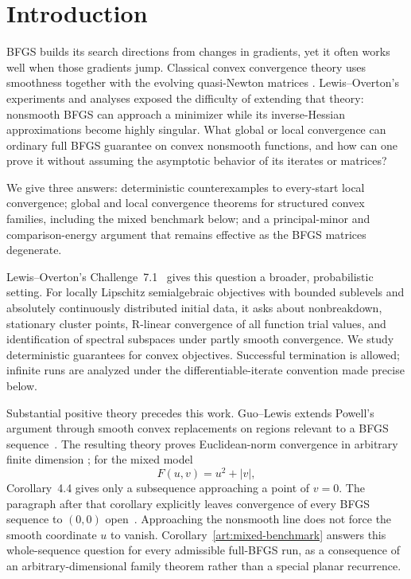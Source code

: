 \section{Introduction}\label{art:introduction}

BFGS builds its search directions from changes in gradients, yet it often
works well when those gradients jump. Classical convex convergence theory
uses smoothness together with the evolving quasi-Newton matrices
\cite{FND_N92,FND_BN89,FND_P76}. Lewis--Overton's experiments and analyses
\cite{LO} exposed the difficulty of extending that theory: nonsmooth BFGS can
approach a minimizer while its inverse-Hessian approximations become highly
singular. What global or local convergence can ordinary full BFGS guarantee
on convex nonsmooth functions, and how can one prove it without assuming
the asymptotic behavior of its iterates or matrices?

We give three answers: deterministic counterexamples to every-start local
convergence; global and local convergence theorems for structured convex
families, including the mixed benchmark below; and a principal-minor and
comparison-energy argument that remains effective as the BFGS matrices
degenerate.

Lewis--Overton's Challenge~7.1~\cite{LO} gives this question a broader,
probabilistic setting. For locally Lipschitz semialgebraic objectives with
bounded sublevels and absolutely continuously distributed initial data, it
asks about nonbreakdown, stationary cluster points, R-linear convergence of
all function trial values, and identification of spectral subspaces under
partly smooth convergence. We study deterministic guarantees for convex
objectives. Successful termination is allowed; infinite runs are analyzed
under the differentiable-iterate convention made precise below.

Substantial positive theory precedes this work. Guo--Lewis extends Powell's
argument through smooth convex replacements on regions relevant to a BFGS
sequence~\cite[Theorems~3.2, 4.1 and~4.3]{GL18}. The resulting theory proves
Euclidean-norm convergence in arbitrary finite dimension
\cite[Corollary~4.2]{GL18}; for the mixed model
\[
                    F(u,v)=u^2+|v|,
\]
Corollary~4.4 gives only a subsequence approaching a point of $v=0$.
The paragraph after that corollary explicitly leaves convergence of every BFGS sequence
to $(0,0)$ open~\cite[Corollary~4.4 and following discussion]{GL18}.
Approaching the nonsmooth line does not force the smooth coordinate $u$ to
vanish. Corollary~\ref{art:mixed-benchmark} answers this whole-sequence question
for every admissible full-BFGS run, as a consequence of an arbitrary-dimensional
family theorem rather than a special planar recurrence.


